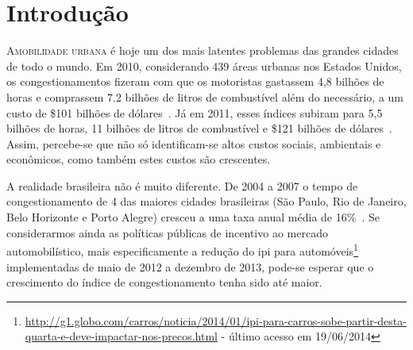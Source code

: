 
\newpage
\chapter{Introdução}
\label{chp: Introdução}

\lettrine{A}{mobilidade urbana} é hoje um dos mais latentes problemas das grandes cidades de todo o mundo. Em 2010, considerando 439 áreas urbanas nos Estados Unidos, os congestionamentos fizeram com que os motoristas gastassem 4,8 bilhões de horas e comprassem 7.2 bilhões de litros de combustível além do necessário, a um custo de \$101 bilhões de dólares~\cite{Eisele2011}. Já em 2011, esses índices subiram para 5,5 bilhões de horas, 11 bilhões de litros de combustível e \$121 bilhões de dólares~\cite{Schrank2012}. Assim, percebe-se que não só identificam-se altos custos sociais, ambientais e econômicos, como também estes custos são crescentes.

A realidade brasileira não é muito diferente. De 2004 a 2007 o tempo de congestionamento de 4 das maiores cidades brasileiras (São Paulo, Rio de Janeiro, Belo Horizonte e Porto Alegre) cresceu a uma taxa anual média de 16\%~\cite{SOUSAPRRESENDE2009}. Se considerarmos ainda as políticas públicas de incentivo ao mercado automobilístico, mais especificamente a redução do \gls{ipi} para automóveis\footnote{\url{http://g1.globo.com/carros/noticia/2014/01/ipi-para-carros-sobe-partir-desta-quarta-e-deve-impactar-nos-precos.html} - último acesso em 19/06/2014} implementadas de maio de 2012 a dezembro de 2013, pode-se esperar que o crescimento do índice de congestionamento tenha sido até maior.

